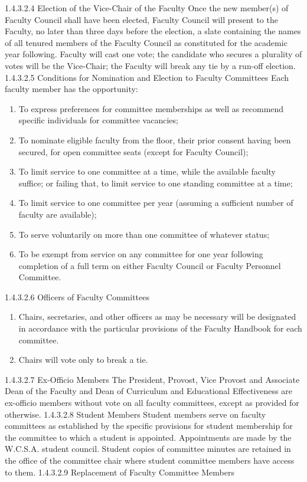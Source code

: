 \documentclass[letterpaper, 11pt]{article}
\begin{document}
				1.4.3.2.4 Election of the Vice-Chair of the Faculty
				Once the new member(s) of Faculty Council shall have been elected, Faculty Council will present to the Faculty, no later than three days before the election, a slate containing the names of all tenured members of the Faculty Council as constituted for the academic year following.  Faculty will cast one vote; the candidate who secures a plurality of votes will be the Vice-Chair; the Faculty will break any tie by a run-off election.
				1.4.3.2.5 Conditions for Nomination and Election to Faculty Committees
				Each faculty member has the opportunity:
				\begin{enumerate}[label=\alph*)]
					\item{To express preferences for committee memberships as well as recommend specific individuals for committee vacancies;}
					\item{To nominate eligible faculty from the floor, their prior consent having been secured, for open committee seats (except for Faculty Council);}
					\item{To limit service to one committee at a time, while the available faculty suffice; or failing that, to limit service to one standing committee at a time;}
					\item{To limit service to one committee per year (assuming a sufficient number of faculty are available);}
					\item{To serve voluntarily on more than one committee of whatever status;}
					\item{To be exempt from service on any committee for one year following completion of a full term on either Faculty Council or Faculty Personnel Committee.}
				\end{enumerate}
				1.4.3.2.6 Officers of Faculty Committees
				\begin{enumerate}[label=\alph*)]
					\item{Chairs, secretaries, and other officers as may be necessary will be designated in accordance with the particular provisions of the Faculty Handbook for each committee.}
					\item{Chairs will vote only to break a tie.}
				\end{enumerate}
				1.4.3.2.7 Ex-Officio Members
				The President, Provost, Vice Provost and Associate Dean of the Faculty and Dean of Curriculum and Educational Effectiveness are ex-officio members without vote on all faculty committees, except as provided for otherwise.
				1.4.3.2.8 Student Members
				Student members serve on faculty committees as established by the specific provisions for student membership for the committee to which a student is appointed. Appointments are made by the W.C.S.A. student council.  Student copies of committee minutes are retained in the office of the committee chair where student committee members have access to them.
				1.4.3.2.9 Replacement of Faculty Committee Members
\end{document}
